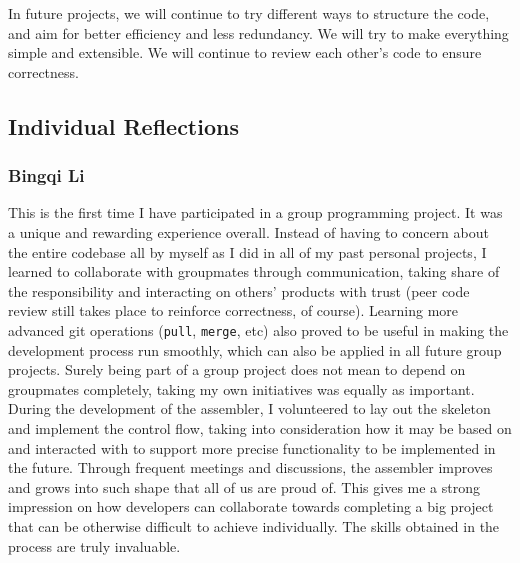 \documentclass[11pt]{article}
\newcommand{\codeword}[1]{\texttt{#1}}
\begin{document}

In future projects, we will continue to try different ways to structure the code, and aim for better efficiency and less redundancy. We will try to make everything simple and extensible. We will continue to review each other’s code to ensure correctness.

\subsection{Individual Reflections}

\subsubsection{Bingqi Li}

This is the first time I have participated in a group programming project. It was a unique and rewarding experience overall. Instead of having to concern about the entire codebase all by myself as I did in all of my past personal projects, I learned to collaborate with groupmates through communication, taking share of the responsibility and interacting on others’ products with trust (peer code review still takes place to reinforce correctness, of course). Learning more advanced git operations (\codeword{pull}, \codeword{merge}, etc) also proved to be useful in making the development process run smoothly, which can also be applied in all future group projects. Surely being part of a group project does not mean to depend on groupmates completely, taking my own initiatives was equally as important. During the development of the assembler, I volunteered to lay out the skeleton and implement the control flow, taking into consideration how it may be based on and interacted with to support more precise functionality to be implemented in the future. Through frequent meetings and discussions, the assembler improves and grows into such shape that all of us are proud of. This gives me a strong impression on how developers can collaborate towards completing a big project that can be otherwise difficult to achieve individually. The skills obtained in the process are truly invaluable.
\end{document}
